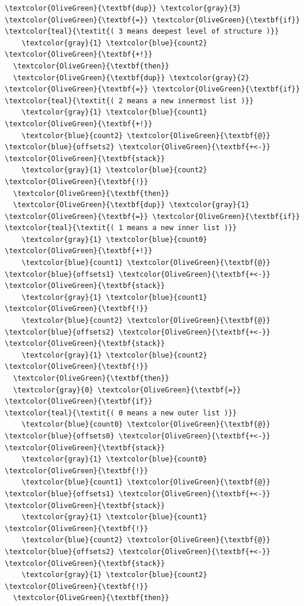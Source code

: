 \documentclass{webofc}
\begin{document}
\begin{Verbatim}[commandchars=\\\{\}]
  \textcolor{OliveGreen}{\textbf{dup}} \textcolor{gray}{3} \textcolor{OliveGreen}{\textbf{=}} \textcolor{OliveGreen}{\textbf{if}}                  \textcolor{teal}{\textit{( 3 means deepest level of structure )}}
    \textcolor{gray}{1} \textcolor{blue}{count2} \textcolor{OliveGreen}{\textbf{+!}}
  \textcolor{OliveGreen}{\textbf{then}}
  \textcolor{OliveGreen}{\textbf{dup}} \textcolor{gray}{2} \textcolor{OliveGreen}{\textbf{=}} \textcolor{OliveGreen}{\textbf{if}}                  \textcolor{teal}{\textit{( 2 means a new innermost list )}}
    \textcolor{gray}{1} \textcolor{blue}{count1} \textcolor{OliveGreen}{\textbf{+!}}
    \textcolor{blue}{count2} \textcolor{OliveGreen}{\textbf{@}} \textcolor{blue}{offsets2} \textcolor{OliveGreen}{\textbf{+<-}} \textcolor{OliveGreen}{\textbf{stack}}
    \textcolor{gray}{1} \textcolor{blue}{count2} \textcolor{OliveGreen}{\textbf{!}}
  \textcolor{OliveGreen}{\textbf{then}}
  \textcolor{OliveGreen}{\textbf{dup}} \textcolor{gray}{1} \textcolor{OliveGreen}{\textbf{=}} \textcolor{OliveGreen}{\textbf{if}}                  \textcolor{teal}{\textit{( 1 means a new inner list )}}
    \textcolor{gray}{1} \textcolor{blue}{count0} \textcolor{OliveGreen}{\textbf{+!}}
    \textcolor{blue}{count1} \textcolor{OliveGreen}{\textbf{@}} \textcolor{blue}{offsets1} \textcolor{OliveGreen}{\textbf{+<-}} \textcolor{OliveGreen}{\textbf{stack}}
    \textcolor{gray}{1} \textcolor{blue}{count1} \textcolor{OliveGreen}{\textbf{!}}
    \textcolor{blue}{count2} \textcolor{OliveGreen}{\textbf{@}} \textcolor{blue}{offsets2} \textcolor{OliveGreen}{\textbf{+<-}} \textcolor{OliveGreen}{\textbf{stack}}
    \textcolor{gray}{1} \textcolor{blue}{count2} \textcolor{OliveGreen}{\textbf{!}}
  \textcolor{OliveGreen}{\textbf{then}}
  \textcolor{gray}{0} \textcolor{OliveGreen}{\textbf{=}} \textcolor{OliveGreen}{\textbf{if}}                      \textcolor{teal}{\textit{( 0 means a new outer list )}}
    \textcolor{blue}{count0} \textcolor{OliveGreen}{\textbf{@}} \textcolor{blue}{offsets0} \textcolor{OliveGreen}{\textbf{+<-}} \textcolor{OliveGreen}{\textbf{stack}}
    \textcolor{gray}{1} \textcolor{blue}{count0} \textcolor{OliveGreen}{\textbf{!}}
    \textcolor{blue}{count1} \textcolor{OliveGreen}{\textbf{@}} \textcolor{blue}{offsets1} \textcolor{OliveGreen}{\textbf{+<-}} \textcolor{OliveGreen}{\textbf{stack}}
    \textcolor{gray}{1} \textcolor{blue}{count1} \textcolor{OliveGreen}{\textbf{!}}
    \textcolor{blue}{count2} \textcolor{OliveGreen}{\textbf{@}} \textcolor{blue}{offsets2} \textcolor{OliveGreen}{\textbf{+<-}} \textcolor{OliveGreen}{\textbf{stack}}
    \textcolor{gray}{1} \textcolor{blue}{count2} \textcolor{OliveGreen}{\textbf{!}}
  \textcolor{OliveGreen}{\textbf{then}}


\end{Verbatim}
\end{document}
